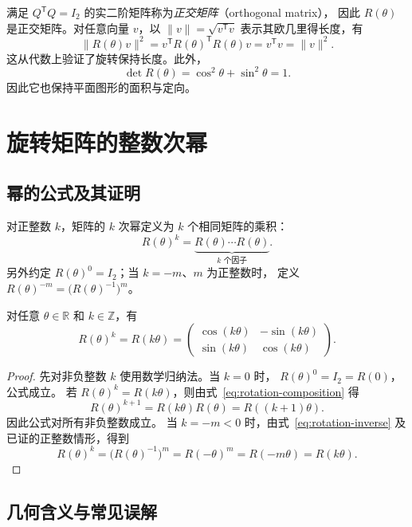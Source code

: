 \documentclass[UTF8,12pt,a4paper,fontset=fandol]{ctexart}
\begin{document}
满足 $Q^{\mathsf T}Q=I_2$ 的实二阶矩阵称为\emph{正交矩阵}（orthogonal matrix），
因此 $R(\theta)$ 是正交矩阵。对任意向量 $v$，以
$\|v\|=\sqrt{v^{\mathsf T}v}$ 表示其欧几里得长度，有
\[
  \|R(\theta)v\|^2
  =v^{\mathsf T}R(\theta)^{\mathsf T}R(\theta)v
  =v^{\mathsf T}v=\|v\|^2.
\]
这从代数上验证了旋转保持长度。此外，
\[
  \det R(\theta)=\cos^2\theta+\sin^2\theta=1.
\]
因此它也保持平面图形的面积与定向。

\section{旋转矩阵的整数次幂}

\subsection{幂的公式及其证明}

对正整数 $k$，矩阵的 $k$ 次幂定义为 $k$ 个相同矩阵的乘积：
\[
  R(\theta)^k=\underbrace{R(\theta)\cdots R(\theta)}_{k\text{ 个因子}}.
\]
另外约定 $R(\theta)^0=I_2$；当 $k=-m$、$m$ 为正整数时，
定义 $R(\theta)^{-m}=\bigl(R(\theta)^{-1}\bigr)^m$。

\begin{theorem}[旋转矩阵的整数次幂]
\label{thm:rotation-power}
对任意 $\theta\in\mathbb R$ 和 $k\in\mathbb Z$，有
\begin{equation}
  \boxed{R(\theta)^k=R(k\theta)
  =\begin{pmatrix}
    \cos(k\theta)&-\sin(k\theta)\\
    \sin(k\theta)&\cos(k\theta)
  \end{pmatrix}.}
  \label{eq:rotation-power}
\end{equation}
\end{theorem}

\begin{proof}
先对非负整数 $k$ 使用数学归纳法。当 $k=0$ 时，
$R(\theta)^0=I_2=R(0)$，公式成立。
若 $R(\theta)^k=R(k\theta)$，则由式~\eqref{eq:rotation-composition} 得
\[
  R(\theta)^{k+1}=R(k\theta)R(\theta)=R((k+1)\theta).
\]
因此公式对所有非负整数成立。
当 $k=-m<0$ 时，由式~\eqref{eq:rotation-inverse} 及已证的正整数情形，得到
\[
  R(\theta)^k=\bigl(R(\theta)^{-1}\bigr)^m
  =R(-\theta)^m=R(-m\theta)=R(k\theta).
\]
\end{proof}

\subsection{几何含义与常见误解}
\end{document}
